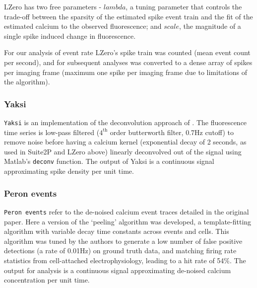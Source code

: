 \documentclass[a4paper,11pt]{article}
\begin{document}
LZero has two free parameters - $lambda$, a tuning parameter that controls the trade-off between the sparsity of the estimated spike event train and the fit of the estimated calcium to the observed fluorescence; and $scale$, the magnitude of a single spike induced change in fluorescence.

For our analysis of event rate LZero's spike train was counted (mean event count per second), and for subsequent analyses was converted to a dense array of spikes per imaging frame (maximum one spike per imaging frame due to limitations of the algorithm).




\subsubsection*{Yaksi}
\texttt{Yaksi} is an implementation of the deconvolution approach of \citet{Yaksi2006-ic}. The fluorescence time series is low-pass filtered ($4^{\text{th}}$ order butterworth filter, 0.7Hz cutoff) to remove noise before having a calcium kernel (exponential decay of 2 seconds, as used in Suite2P and LZero above) linearly deconvolved out of the signal using Matlab's {\tt deconv} function. The output of Yaksi is a continuous signal approximating spike density per unit time.

\subsubsection*{Peron events}
\texttt{Peron events} refer to the de-noised calcium event traces detailed in the original \cite{Peron2015-kd} paper. Here a version of the `peeling' algorithm \citep{Lutcke2013-wu} was developed, a template-fitting algorithm with variable decay time constants across events and cells. This algorithm was tuned by the authors to generate a low number of false positive detections (a rate of 0.01Hz) on ground truth data, and matching firing rate statistics from cell-attached electrophysiology, leading to a hit rate of 54$\%$. The output for analysis is a continuous signal approximating de-noised calcium concentration per unit time.
\end{document}
